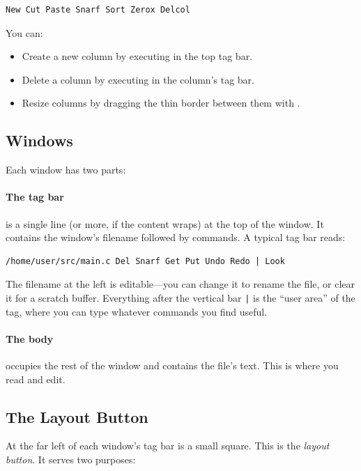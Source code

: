 \begin{Verbatim}[frame=single]
New Cut Paste Snarf Sort Zerox Delcol
\end{Verbatim}

\noindent
You can:

\begin{itemize}
\item Create a new column by executing  in the top tag bar.
\item Delete a column by executing  in the column's tag bar.
\item Resize columns by dragging the thin border between them with
      .
\end{itemize}

\subsection{Windows}

Each window has two parts:

\paragraph{The tag bar}
is a single line (or more, if the content wraps) at the top of the
window.  It contains the window's filename followed by commands.  A
typical tag bar reads:

\begin{Verbatim}[frame=single]
/home/user/src/main.c Del Snarf Get Put Undo Redo | Look
\end{Verbatim}

The filename at the left is editable---you can change it to rename the
file, or clear it for a scratch buffer.  Everything after the vertical
bar \texttt{|} is the ``user area'' of the tag, where you can type
whatever commands you find useful.

\paragraph{The body}
occupies the rest of the window and contains the file's text.  This is
where you read and edit.

\subsection{The Layout Button}

At the far left of each window's tag bar is a small square.  This is
the \emph{layout button}.  It serves two purposes:

